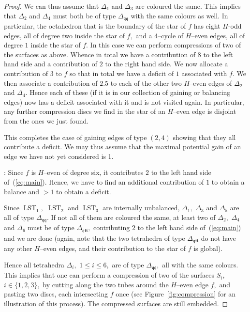 \documentclass[a4paper]{gtart}
\def\lst{\operatorname{LST}}
\def\Tqtt{\Delta_{\mathfrak{qtt}}}
\def\Tqq{\Delta_{\mathfrak{qq}}}
\theoremstyle{plain}
\theoremstyle{definition}
\theoremstyle{remark}
\numberwithin{equation}{section}
\begin{document}
\begin{proof}
We can thus assume that $\Delta_1$ and $\Delta_3$ are coloured the same. This implies that $\Delta_2$ and $\Delta_4$ must both be of type $\Tqq$ with the same colours as well. In particular, the octahedron that is the boundary of the star of $f$ has eight $H$-odd edges, all of degree two inside the star of $f,$ and a 4--cycle of $H$--even edges, all of degree $1$ inside the star of $f.$ In this case we can perform compressions of two of the surfaces as above. Whence in total we have a contribution of $8$ to the left hand side and a contribution of $2$ to the right hand side. We now allocate a contribution of $3$ to $f$ so that in total we have a deficit of $1$ associated with $f.$ We then associate a contribution of $2.5$ to each of the other two $H$--even edges of $\Delta_2$ and $\Delta_4.$ Hence each of these (if it is in our collection of gaining or balancing edges) now has a deficit associated with it and is not visited again. In particular, any further compression discs we find in the star of an $H$--even edge is disjoint from the ones we just found.

\medskip

This completes the case of gaining edges of type $(2,4)$ showing that they all contribute a deficit.
We may thus assume that the maximal potential gain of an edge we have not yet considered is 1.

\medskip

: Since $f$ is $H$--even of degree six, it contributes $2$ to the left hand side of~(\ref{eq:main}). Hence, we have to find an additional contribution of $1$ to obtain a balance and $>1$ to obtain a deficit.

Since $\lst_1,$ $\lst_2$ and $\lst_3$ are internally unbalanced, $\Delta_1,$ $\Delta_3$ and $\Delta_5$ are all of type $\Tqq.$ If not all of them are coloured the same, at least two of $\Delta_2,$ $\Delta_4$ and $\Delta_6$ must be of type $\Tqtt,$ contributing $2$ to the left hand side of~(\ref{eq:main}) and we are done (again, note that the two tetrahedra of type $\Tqtt$ do not have any other $H$--even edges, and their contribution to the star of $f$ is global). 

Hence all tetrahedra $\Delta_i,$ $1\leq i \leq 6,$ are of type $\Tqq,$ all with the same colours. This implies that one can perform a compression of two of the surfaces $S_i,$ $i  \in \{1,2,3\},$ by cutting along the two tubes around the $H$--even edge $f,$ and pasting two discs, each intersecting $f$ once (see Figure~\ref{fig:compression} for an illustration of this process). The compressed surfaces are still embedded.


\end{proof}
\end{document}

